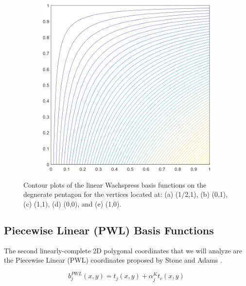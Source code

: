 \begin{figure}
\begin{subfigure}[b]{0.39\textwidth}
		\caption{}
	\end{subfigure}
	\hspace{1.5cm}
	\begin{subfigure}[b]{0.39\textwidth}
		\centering
		\includegraphics[width=\textwidth]{figures/sec_BF/deg_square_WACHSPRESS1_contour_b2.png}
		\caption{}
	\end{subfigure}
\caption{Contour plots of the linear Wachspress basis functions on the degnerate pentagon for the vertices located at: (a) (1/2,1), (b) (0,1), (c) (1,1), (d) (0,0), and (e) (1,0).}
\end{figure}

\subsection{Piecewise Linear (PWL) Basis Functions}
\label{sec::BF_2DLinear_PWL}

The second linearly-complete 2D polygonal coordinates that we will analyze are the Piecewise Linear (PWL) coordinates proposed by Stone and Adams \cite{ref::PWLD_stone_adams,ref::PWLD_stone_adams_unstructured}.

\begin{equation}
\label{eq::PWL_2D}
	b_j^{PWL} (x,y) = t_j (x,y) + \alpha_j^K t_c (x,y)
\end{equation}

